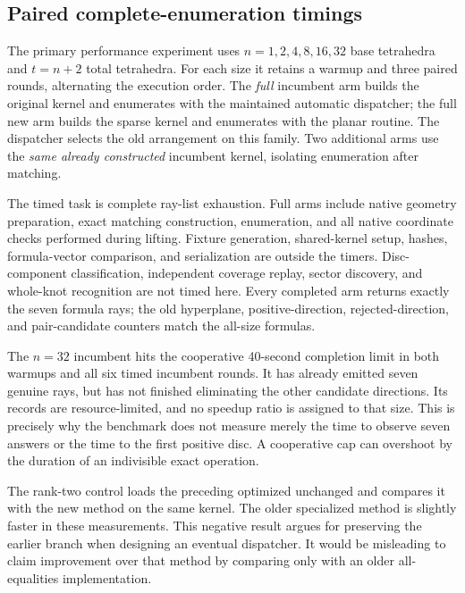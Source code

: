 \subsection{Paired complete-enumeration timings}

The primary performance experiment uses \(n=1,2,4,8,16,32\)
base tetrahedra and \(t=n+2\) total tetrahedra.
For each size it retains a warmup and three paired rounds,
alternating the execution order.  The \emph{full} incumbent
arm builds the original kernel and enumerates with the
maintained automatic dispatcher; the full new arm builds
the sparse kernel and enumerates with the planar routine.
The dispatcher selects the old arrangement on this family.
Two additional arms use the \emph{same already constructed}
incumbent kernel, isolating enumeration after matching.

The timed task is complete ray-list exhaustion.  Full arms
include native geometry preparation, exact matching
construction, enumeration, and all native coordinate
checks performed during lifting.  Fixture generation,
shared-kernel setup, hashes, formula-vector comparison,
and serialization are outside the timers.  Disc-component
classification, independent coverage replay, sector
discovery, and whole-knot recognition are not timed here.
Every completed arm returns exactly the seven formula rays;
the old hyperplane, positive-direction, rejected-direction,
and pair-candidate counters match the all-size formulas.



The \(n=32\) incumbent hits the cooperative 40-second
completion limit in both warmups and all six timed
incumbent rounds.  It has already emitted seven genuine
rays, but has not finished eliminating the other candidate
directions.  Its records are resource-limited, and no
speedup ratio is assigned to that size.  This is precisely
why the benchmark does not measure merely the time to
observe seven answers or the time to the first positive
disc.  A cooperative cap can overshoot by the duration
of an indivisible exact operation.

The rank-two control loads the preceding optimized
 unchanged and compares it with
the new method on the same kernel.  The older specialized
method is slightly faster in these measurements.  This
negative result argues for preserving the earlier branch
when designing an eventual dispatcher.  It would be
misleading to claim improvement over that method by
comparing only with an older all-equalities implementation.

